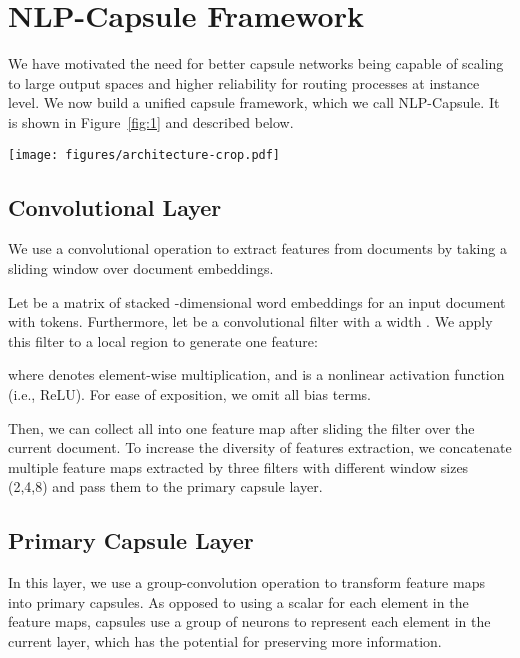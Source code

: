 \documentclass[11pt,a4paper]{article}
\newcommand{\1}{\boldsymbol{1}}
\begin{document}
\section{NLP-Capsule Framework}\label{sec:approach}



We have motivated the need for better capsule networks being capable of scaling to large output spaces and higher reliability for routing processes at instance level. We now build a unified capsule framework, which we call NLP-Capsule. It is shown in Figure~\ref{fig:1} and described below.



\begin{figure*}
\centering
\texttt{[image: figures/architecture-crop.pdf]}
\caption{An illustration of NLP-Capsule framework.}
\label{fig:1}
\vspace{-0.15in}
\end{figure*}

\subsection{Convolutional Layer} 
We use a convolutional operation 
to extract features from documents by taking a sliding window over document embeddings.

Let  be a matrix of stacked -dimensional word embeddings for an input document with  tokens. 
Furthermore, let  be a convolutional filter with a width . We apply this filter
to a local region  to generate one feature: 

where  denotes element-wise multiplication, and  is a nonlinear activation function (i.e., ReLU). For ease of exposition, we omit all bias terms. 

Then, we can collect all  into one feature map  after sliding the filter 
over the current document. To increase the diversity of features extraction, we concatenate multiple feature maps extracted by three filters with different window sizes (2,4,8) and pass them to the primary capsule layer.

\subsection{Primary Capsule Layer}
In this layer, we use a group-convolution operation to transform feature maps into primary capsules.
As opposed to using a scalar for each element in the feature maps,
capsules use a group of neurons to represent each element in the current layer,
which has the potential for preserving more information.
\end{document}
